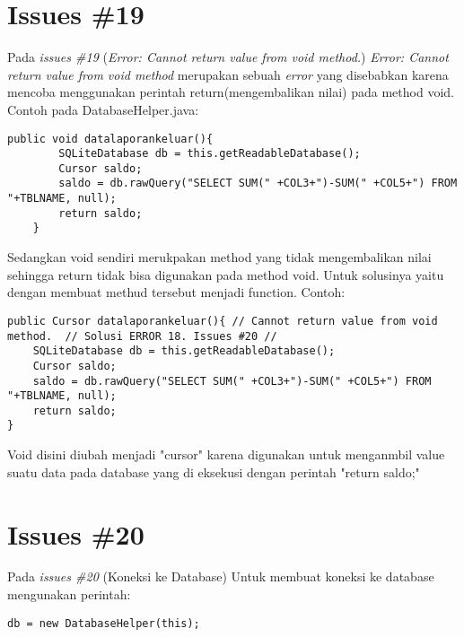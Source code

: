 \section{Issues \#19}
Pada \textit{issues \#19} (\textit{Error: Cannot return value from void method.}) \textit{Error: Cannot return value from void method} merupakan sebuah \textit{error} yang disebabkan karena mencoba menggunakan perintah return(mengembalikan nilai) pada method void. Contoh pada DatabaseHelper.java:
\begin{verbatim}
public void datalaporankeluar(){ 
        SQLiteDatabase db = this.getReadableDatabase();
        Cursor saldo;
        saldo = db.rawQuery("SELECT SUM(" +COL3+")-SUM(" +COL5+") FROM "+TBLNAME, null);
        return saldo;
    }
\end{verbatim}
Sedangkan void sendiri merukpakan method yang tidak mengembalikan nilai sehingga return tidak bisa digunakan pada method void. Untuk solusinya yaitu dengan membuat methud tersebut menjadi function. Contoh: 
\begin{verbatim}
public Cursor datalaporankeluar(){ // Cannot return value from void method.  // Solusi ERROR 18. Issues #20 //
    SQLiteDatabase db = this.getReadableDatabase();
    Cursor saldo;
    saldo = db.rawQuery("SELECT SUM(" +COL3+")-SUM(" +COL5+") FROM "+TBLNAME, null);
    return saldo;
}
\end{verbatim}
Void disini diubah menjadi "cursor" karena digunakan untuk menganmbil value suatu data pada database yang di eksekusi dengan perintah "return saldo;"

\section{Issues \#20}
Pada \textit{issues \#20} (Koneksi ke Database) Untuk membuat koneksi ke database mengunakan perintah:
\begin{verbatim}
db = new DatabaseHelper(this);
\end{verbatim}
